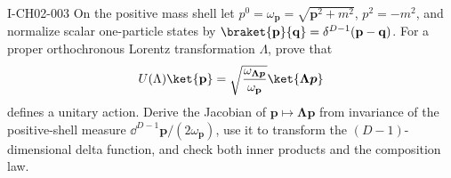 \begin{exercise}{I-CH02-003}
On the positive mass shell let $p^0=\omega_{\mathbf p}
=\sqrt{\mathbf p^2+m^2}$, $p^2=-m^2$, and normalize scalar one-particle states by
$\braket{\mathbf p}{\mathbf q}=\delta^{D-1}(\mathbf p-\mathbf q)$. For a proper orthochronous
Lorentz transformation $\Lambda$, prove that
\[
  U(\Lambda)\ket{\mathbf p}
  =\sqrt{\frac{\omega_{\boldsymbol{\Lambda p}}}{\omega_{\mathbf p}}}\ket{\boldsymbol{\Lambda p}}
\]
defines a unitary action. Derive the Jacobian of
$\mathbf p\mapsto\boldsymbol{\Lambda p}$ from invariance of the positive-shell
measure $\dd^{D-1}\mathbf p/(2\omega_{\mathbf p})$, use it to transform the $(D-1)$-dimensional
delta function, and check both inner products and the composition law.
\end{exercise}
